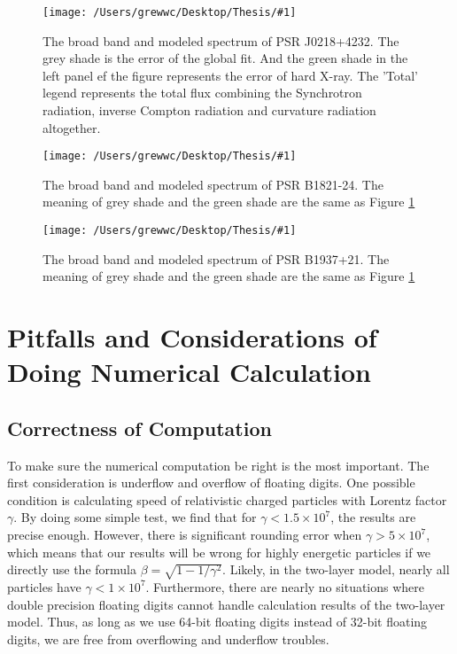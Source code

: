 \documentclass[12pt]{report}
\newcommand{\singleFig}[3]{
  \begin{figure}[!ht]
    \centering
    \texttt{[image: /Users/grewwc/Desktop/Thesis/\#1]}
    \caption{#3}
    \label{fig: #1}
  \end{figure}
}
\begin{document}
        \singleFig{j0218_twolayer_all.png}{0.39}{The broad band and modeled spectrum of PSR J0218+4232.
          The grey shade is the error of the global fit. And the green shade in the left panel ef the 
          figure represents the error of hard X-ray. The 'Total' legend represents the total flux 
          combining the Synchrotron radiation, inverse Compton radiation and curvature radiation
          altogether.}
        \vspace{0.5cm} 
        
        \singleFig{b1821_twolayer_all.png}{0.4}{The broad band and modeled spectrum of PSR B1821-24.
          The meaning of grey shade and the green shade are the same as Figure \ref{fig: j0218_twolayer_all.png}}
        \vspace{0.5cm} 
          
        \singleFig{j1939_twolayer_all.png}{0.39}{The broad band and modeled spectrum of PSR B1937+21.
          The meaning of grey shade and the green shade are the same as Figure
          \ref{fig: j0218_twolayer_all.png}}
        \vspace{0.5cm}
        
      \section{Pitfalls and Considerations of Doing Numerical Calculation}
        \subsection{Correctness of Computation}
          To make sure the numerical computation be right is the most important. 
          The first consideration is underflow and overflow of floating digits.
          One possible condition is calculating speed of relativistic charged particles with 
          Lorentz factor $\gamma$. By doing some simple test, we find that for 
          $\gamma < 1.5\times 10^7$, the results are precise enough. However, there is significant rounding error
          when $\gamma > 5\times 10^7$, which means that our results will be wrong for highly 
          energetic particles if we directly use the formula $\beta = \sqrt{1 - 1/\gamma^2}$.
          Likely, in the two-layer model, nearly all particles have $\gamma < 1\times 10^7$. 
          Furthermore, there are nearly no situations where double precision floating digits
          cannot handle calculation results of the two-layer model. Thus, as long as we use 
          64-bit floating digits instead of 32-bit floating digits, we are free from overflowing and 
          underflow troubles. 
            
\end{document}
